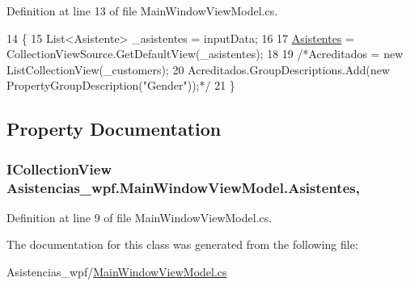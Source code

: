 Definition at line 13 of file Main\-Window\-View\-Model.\-cs.


\begin{DoxyCode}
14         \{
15             List<Asistente> \_asistentes = inputData;
16 
17             \hyperlink{class_asistencias__wpf_1_1_main_window_view_model_ab8d721f36e3d86b111758057af886e77}{Asistentes} = CollectionViewSource.GetDefaultView(\_asistentes);
18 
19             \textcolor{comment}{/*Acreditados = new ListCollectionView(\_customers);}
20 \textcolor{comment}{            Acreditados.GroupDescriptions.Add(new PropertyGroupDescription("Gender"));*/}
21         \}
\end{DoxyCode}


\subsection{Property Documentation}
\hypertarget{class_asistencias__wpf_1_1_main_window_view_model_ab8d721f36e3d86b111758057af886e77}{
\subsubsection[{Asistentes}]{\setlength{\rightskip}{0pt plus 5cm}I\-Collection\-View Asistencias\-\_\-wpf.\-Main\-Window\-View\-Model.\-Asistentes\hspace{0.3cm}{\ttfamily [get]}, {\ttfamily [set]}}}\label{class_asistencias__wpf_1_1_main_window_view_model_ab8d721f36e3d86b111758057af886e77}


Definition at line 9 of file Main\-Window\-View\-Model.\-cs.



The documentation for this class was generated from the following file\-:\begin{DoxyCompactItemize}
\item 
Asistencias\-\_\-wpf/\hyperlink{_main_window_view_model_8cs}{Main\-Window\-View\-Model.\-cs}\end{DoxyCompactItemize}
